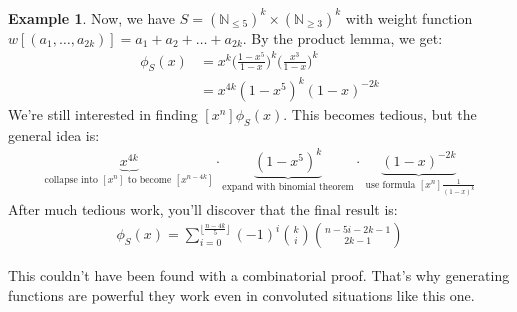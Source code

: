 \documentclass[]{article}
\theoremstyle{definition}
\newtheorem{ex}{Example}[section]
\begin{document}
\begin{ex}
					Now, we have $S = (\mathbb{N}_{\le 5})^k \times (\mathbb{N}_{\ge 3})^k$ with weight function $w[(a_1, \ldots, a_{2k})] = a_1 + a_2 + \ldots + a_{2k}$. By the product lemma, we get:
					\begin{align*}
						\phi_S(x) &= x^k \bigg(\frac{1 - x^5}{1 - x}\bigg)^k \bigg( \frac{x^3}{1 - x} \bigg)^k \\
						&= x^{4k}(1 - x^5)^k (1-x)^{-2k}
					\end{align*}
					We're still interested in finding $[x^n]\phi_S(x)$. This becomes tedious, but the general idea is:
					\begin{align*}
						[x^n] \underbrace{x^{4k}}_{\text{collapse into } [x^n] \text{ to become } [x^{n - 4k}]} \cdot \underbrace{(1 - x^5)^k}_{\text{expand with binomial theorem}} \cdot \underbrace{(1 - x)^{-2k}}_{\text{ use formula } [x^n]\frac{1}{(1 - x)^k}}
					\end{align*}
					After much tedious work, you'll discover that the final result is:
					\begin{align*}
						[x^n] \phi_S(x) = \sum_{i = 0}^{\lfloor \frac{n - 4k}{5} \rfloor} (-1)^i {k \choose i} {n - 5i - 2k - 1 \choose 2k - 1}
					\end{align*}

					This couldn't have been found with a combinatorial proof. That's why generating functions are powerful \textendash{} they work even in convoluted situations like this one.
				\end{ex}
\end{document}
